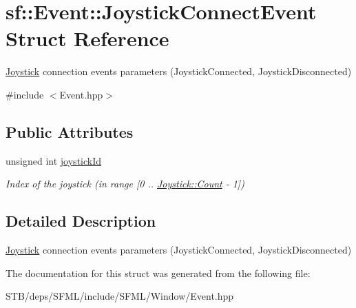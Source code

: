 \hypertarget{structsf_1_1_event_1_1_joystick_connect_event}{\section{sf\+:\+:Event\+:\+:Joystick\+Connect\+Event Struct Reference}
\label{structsf_1_1_event_1_1_joystick_connect_event}
}


\hyperlink{classsf_1_1_joystick}{Joystick} connection events parameters (Joystick\+Connected, Joystick\+Disconnected)  




{\ttfamily \#include $<$Event.\+hpp$>$}

\subsection*{Public Attributes}
\begin{DoxyCompactItemize}
\item 
\hypertarget{structsf_1_1_event_1_1_joystick_connect_event_a08e58e8559d3e4fe4654855fec79194b}{unsigned int \hyperlink{structsf_1_1_event_1_1_joystick_connect_event_a08e58e8559d3e4fe4654855fec79194b}{joystick\+Id}}\label{structsf_1_1_event_1_1_joystick_connect_event_a08e58e8559d3e4fe4654855fec79194b}

\begin{DoxyCompactList}\small\item\em Index of the joystick (in range \mbox{[}0 .. \hyperlink{classsf_1_1_joystick_a951a7c775921304a5f3443c6e2bb4d65a6e0a2a95bc1da277610c04d80f52715e}{Joystick\+::\+Count} -\/ 1\mbox{]}) \end{DoxyCompactList}\end{DoxyCompactItemize}


\subsection{Detailed Description}
\hyperlink{classsf_1_1_joystick}{Joystick} connection events parameters (Joystick\+Connected, Joystick\+Disconnected) 

The documentation for this struct was generated from the following file\+:\begin{DoxyCompactItemize}
\item 
S\+T\+B/deps/\+S\+F\+M\+L/include/\+S\+F\+M\+L/\+Window/Event.\+hpp\end{DoxyCompactItemize}
